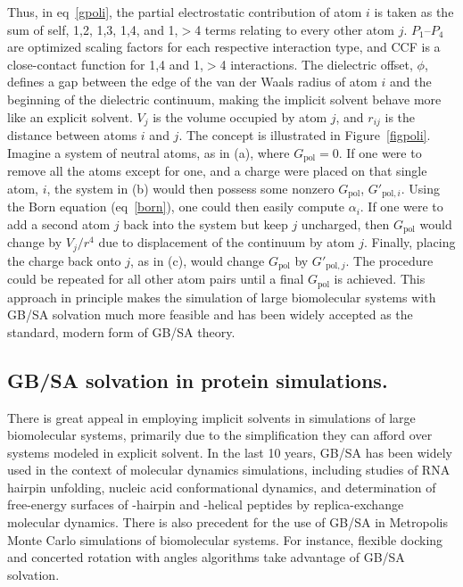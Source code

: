 \documentclass[12pt]{report}
\def\figlab{Figure}\def\figslab{\figlab s}
\def\equlab{eq}\def\equslab{Eqs.}
\newcommand*\eq[1]{\equlab~\ref{#1}}
\newcommand*\fig[1]{\figlab~\ref{#1}}
\begin{document}
Thus, in \eq{gpoli}, the partial electrostatic contribution of atom $i$ is taken as the sum of self, 1,2, 1,3, 1,4, and 1,$>$4 terms relating to every other atom $j$. $P_{1}$--$P_{4}$ are optimized scaling factors for each respective interaction type, and CCF is a close-contact function for 1,4 and 1,$>$4 interactions. The dielectric offset, $\phi$, defines a gap between the edge of the van der Waals radius of atom $i$ and the beginning of the dielectric continuum, making the implicit solvent behave more like an explicit solvent. $V_{j}$ is the volume occupied by atom $j$, and $r_{ij}$ is the distance between atoms $i$ and $j$. The concept is illustrated in \fig{figpoli}. Imagine a system of neutral atoms, as in (a), where $G_{\textrm{pol}} = 0$. If one were to remove all the atoms except for one, and a charge were placed on that single atom, $i$, the system in (b) would then possess some nonzero $G_{\textrm{pol}}$, $G'_{\textrm{pol},i}$. Using the Born equation (\eq{born}), one could then easily compute $\alpha_{i}$. If one were to add a second atom $j$ back into the system but keep $j$ uncharged, then $G_{\textrm{pol}}$ would change by $V_{j}/r^{4}$ due to displacement of the continuum by atom $j$. Finally, placing the charge back onto $j$, as in (c), would change $G_{\textrm{pol}}$ by $G'_{\textrm{pol},j}$. The procedure could be repeated for all other atom pairs until a final $G_{\textrm{pol}}$ is achieved. This approach in principle makes the simulation of large biomolecular systems with GB/SA solvation much more feasible and has been widely accepted as the standard, modern form of GB/SA theory. \cite{jorg2005, jorg2004}


\subsection{GB/SA solvation in protein simulations.}

There is great appeal in employing implicit solvents in simulations of large biomolecular systems, \cite{bashford} primarily due to the simplification they can afford over systems modeled in explicit solvent. In the last 10 years, GB/SA has been widely used in the context of molecular dynamics simulations, including studies of RNA hairpin unfolding,\cite{sorin1} nucleic acid conformational dynamics,\cite{sorin2} and determination of free-energy surfaces of \textbeta-hairpin and \textalpha-helical peptides by replica-exchange molecular dynamics.\cite{felts} There is also precedent for the use of GB/SA in Metropolis\cite{metropolis} Monte Carlo simulations of biomolecular systems. For instance, flexible docking\cite{taylor} and concerted rotation with angles\cite{ulmschneider1, ulmschneider2} algorithms take advantage of GB/SA solvation.
\end{document}
